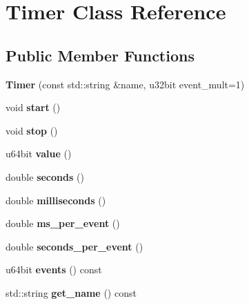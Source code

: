 \hypertarget{classTimer}{\section{Timer Class Reference}
\label{classTimer}
}
\subsection*{Public Member Functions}
\begin{DoxyCompactItemize}
\item 
\hypertarget{classTimer_ad1ad6e16ebc441038b283b2c486adf07}{{\bfseries Timer} (const std\-::string \&name, u32bit event\-\_\-mult=1)}\label{classTimer_ad1ad6e16ebc441038b283b2c486adf07}

\item 
\hypertarget{classTimer_a3a8b5272198d029779dc9302a54305a8}{void {\bfseries start} ()}\label{classTimer_a3a8b5272198d029779dc9302a54305a8}

\item 
\hypertarget{classTimer_a63f0eb44b27402196590a03781515dba}{void {\bfseries stop} ()}\label{classTimer_a63f0eb44b27402196590a03781515dba}

\item 
\hypertarget{classTimer_a66157ce41da4a2f65942d8e16ea36969}{u64bit {\bfseries value} ()}\label{classTimer_a66157ce41da4a2f65942d8e16ea36969}

\item 
\hypertarget{classTimer_a045bb982f9132c9043fb10be01370485}{double {\bfseries seconds} ()}\label{classTimer_a045bb982f9132c9043fb10be01370485}

\item 
\hypertarget{classTimer_a69cf2be1074e175ffea427c0d67411ec}{double {\bfseries milliseconds} ()}\label{classTimer_a69cf2be1074e175ffea427c0d67411ec}

\item 
\hypertarget{classTimer_a652d139c364d32c2b9f55b48fa906d0a}{double {\bfseries ms\-\_\-per\-\_\-event} ()}\label{classTimer_a652d139c364d32c2b9f55b48fa906d0a}

\item 
\hypertarget{classTimer_a6795ea9d6a21467ecfc257990edd6633}{double {\bfseries seconds\-\_\-per\-\_\-event} ()}\label{classTimer_a6795ea9d6a21467ecfc257990edd6633}

\item 
\hypertarget{classTimer_acbc99a0cc07f2808b408127115a193bc}{u64bit {\bfseries events} () const }\label{classTimer_acbc99a0cc07f2808b408127115a193bc}

\item 
\hypertarget{classTimer_af5b329ea0063dc4291c29c410ff8e166}{std\-::string {\bfseries get\-\_\-name} () const }\label{classTimer_af5b329ea0063dc4291c29c410ff8e166}

\end{DoxyCompactItemize}
